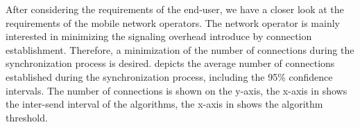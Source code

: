 After considering the requirements of the end-user, we have a closer look at the requirements of the mobile network operators.
The network operator is mainly interested in minimizing the signaling overhead introduce by connection establishment.
Therefore, a minimization of the number of connections during the synchronization process is desired.
 depicts the average number of connections \connectionCount established during the synchronization process, including the 95\% confidence intervals.
The number of connections is shown on the y-axis, the x-axis in  shows the inter-send interval of the \algointerval algorithms, the x-axis in  shows the \algosize algorithm threshold.

